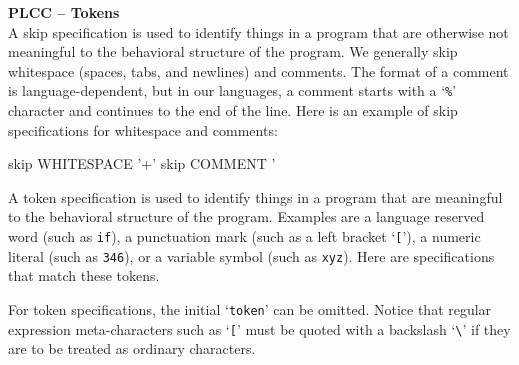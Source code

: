 \begin{minipage}[t]{\sw}
\slidenumber
\LARGE
{\bf PLCC -- Tokens}\\
\Large
A skip specification is used
to identify things in a program
that are otherwise not meaningful
to the behavioral structure of the program.
We generally skip whitespace (spaces, tabs, and newlines) and comments.
The format of a comment is language-dependent,
but in our languages, a comment starts with a `\verb'%'' character
and continues to the end of the line.
Here is an example of skip specifications for whitespace and comments:
\begin{qv}
skip WHITESPACE '\s+'
skip COMMENT '%
\end{qv}
A token specification is used to identify things in a program
that are meaningful to the behavioral structure of the program.
Examples are a language reserved word (such as \verb'if'),
a punctuation mark (such as a left bracket `\verb'[''),
a numeric literal (such as \verb'346'),
or a variable symbol (such as \verb'xyz').
Here are specifications that match these tokens.
For token specifications, the initial `\verb'token'' can be omitted.
Notice that regular expression meta-characters such as `\verb'[''
must be quoted with a backslash `\verb'\''
if they are to be treated as ordinary characters.

\end{minipage}
\clearpage
